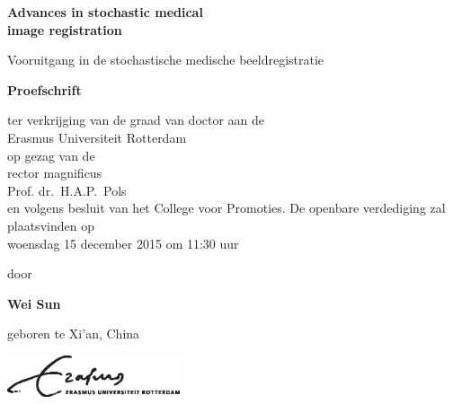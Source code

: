%
%

\setlength{\parindent}{0pt}
\thispagestyle{empty}

\begin{center}

  \vspace*{5mm}
  {\huge\bf Advances in stochastic medical\\[0.3ex]image registration\\}

  \vfill
  \vfill
  \vfill

  {\large Vooruitgang in de stochastische medische beeldregistratie \\[1ex]}


  \vfill
  \vfill
  \vfill
  \vfill

  {\large\bf Proefschrift}
  {\large
  \vfill
  \vfill

  \normalsize

  ter verkrijging van de graad van doctor aan de \\Erasmus Universiteit Rotterdam\\
op gezag van de \\rector magnificus\\
  \vfill
Prof. dr.~H.A.P.~Pols\\
  \vfill
en
volgens besluit van het College voor Promoties.
  \vfill
De openbare verdediging zal plaatsvinden op \\woensdag 15 december 2015 om 11:30 uur


  \vfill
  \vfill

  \large
  door}

  \vfill
  \vfill
  \vfill

  {\large\bf Wei Sun}

  \vfill

  {\large geboren te Xi'an, China}

  \vfill
  \vfill
\includegraphics[width=0.38\textwidth]{logo/eurlogo.eps}
\end{center}


